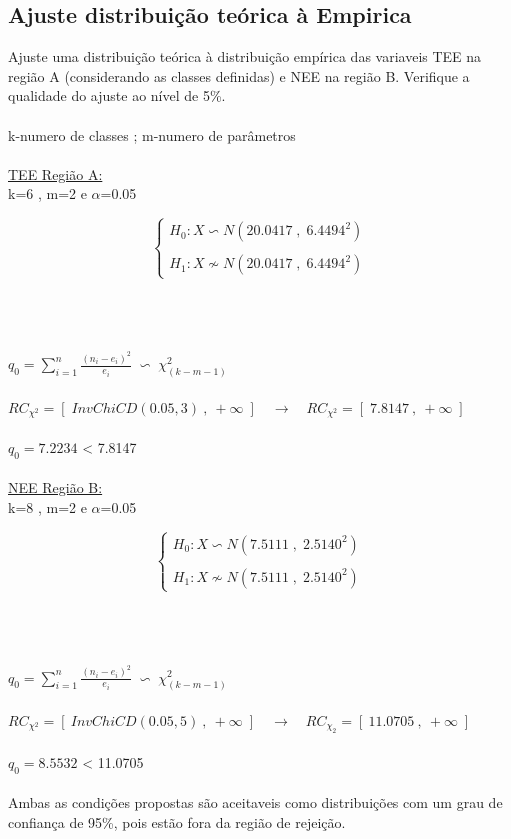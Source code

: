 \subsection{Ajuste distribuição teórica à Empirica}
Ajuste uma distribuição teórica à distribuição empírica das variaveis TEE na região A (considerando as classes definidas) e NEE na região B. Verifique a qualidade do ajuste ao nível de 5\%.\\
\\
k-numero de classes \hspace{1cm}; m-numero de parâmetros
\\
\\
\hspace*{5cm} \underline{TEE Região A:} \\
k=6 , m=2 e $\alpha$=0.05 \\
\begin{minipage}[l]{0pt}
$$\left\lbrace\begin{array}{l}
H_0: X \backsim N (20.0417\;,\;6.4494^2) \\
\\
H_1: X \nsim N (20.0417\;,\;6.4494^2)
\end{array}\right.$$
\end{minipage}\\
\\
\\
$q_0=\sum_{i=1}^n \frac{(n_i-e_i)^2}{e_i} \;\backsim\; \chi_{(k-m-1)}^2$ \\
\\
$RC_{\chi^2}=\left[\; InvChiCD(0.05,3) \:,\: +\infty \; \right] \quad \rightarrow \quad RC_{\chi^2}=\left[\; 7.8147 \:,\: +\infty \; \right]$ \\
\\
$q_0=7.2234$ < 7.8147 \\
\\
\hspace*{5cm} \underline{NEE Região B:} \\
k=8 , m=2 e $\alpha$=0.05 \\
\begin{minipage}[l]{0pt}
$$\left\lbrace\begin{array}{l}
H_0: X \backsim N (7.5111\;,\;2.5140^2) \\
\\
H_1: X \nsim N (7.5111\;,\;2.5140^2)
\end{array}\right.$$
\end{minipage}\\
\\
\\
$q_0=\sum_{i=1}^n \frac{(n_i-e_i)^2}{e_i} \;\backsim\; \chi_{(k-m-1)}^2$ \\
\\
$RC_{\chi^2}=\left[ \: InvChiCD(0.05,5) \:,\: +\infty \; \right] \quad \rightarrow \quad RC_{\chi_2}=\left[ \: 11.0705 \:,\: +\infty \; \right]$ \\
\\
$q_0=8.5532$ < 11.0705 \\
\\
Ambas as condições propostas são aceitaveis como distribuições com um grau de confiança de 95\%, pois estão fora da região de rejeição.
